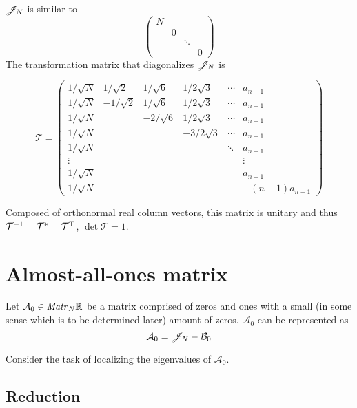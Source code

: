 \documentclass{article}
\begin{document}
\begin{propose}
    $\mathscr{J}_{N}$ is similar to
    $$\begin{pmatrix}
        N &   &        & \\
        & 0 &        & \\
        &   & \ddots & \\
        &   &        & 0
    \end{pmatrix}$$
    The transformation matrix that diagonalizes $\mathscr{J}_{N}$ is

    $$\mathcal T =
    \begin{pmatrix}
        1/\sqrt N &  1/\sqrt2 & 1/\sqrt6  & 1/2\sqrt3  & \cdots & a_{n-1} \\
        1/\sqrt N & -1/\sqrt2 & 1/\sqrt6  & 1/2\sqrt3  & \cdots & a_{n-1} \\
        1/\sqrt N &           & -2/\sqrt6 & 1/2\sqrt3  & \cdots & a_{n-1} \\
        1/\sqrt N &           &           & -3/2\sqrt3 & \cdots & a_{n-1} \\
        1/\sqrt N &           &           &            & \ddots & a_{n-1} \\
        \vdots    &           &           &            &        & \vdots  \\
        1/\sqrt N &           &           &            &        & a_{n-1} \\
        1/\sqrt N &           &           &            &        & -(n-1)a_{n-1}
    \end{pmatrix}$$

    Composed of orthonormal real column vectors, this matrix is unitary
    and thus $\mathcal T^{-1} = \mathcal T^{\mathrm{*}} = \mathcal T^{\mathrm{T}}$,
    $\det\mathcal T = 1$.
\end{propose}

\section{Almost-all-ones matrix}
Let $\mathcal A_0\in\mathit{Matr}_{N} {\mathbb{R}}$ be a matrix comprised of zeros and ones
with a small (in some sense which is to be determined later) amount of zeros.
$\mathcal A_0$ can be represented as
$$\mathcal A_0 = \mathscr{J}_{N} - \mathcal B_0$$

Consider the task of localizing the eigenvalues of $\mathcal A_0$.

\subsection{Reduction}
% 
\end{document}
